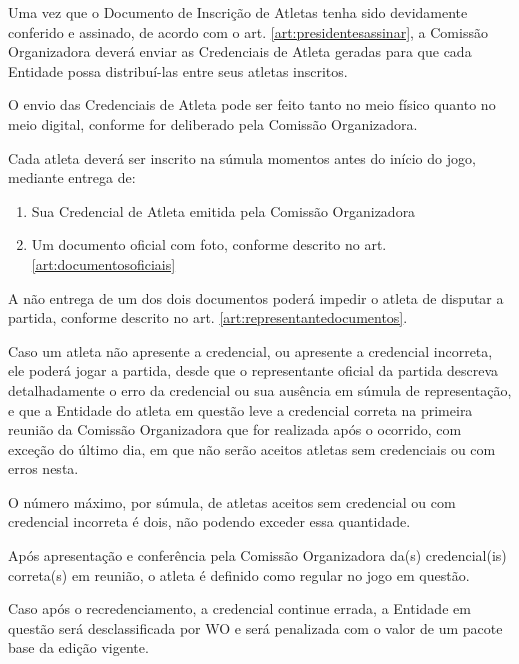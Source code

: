\begin{article}
    Uma vez que o Documento de Inscrição de Atletas tenha sido devidamente conferido e assinado, de acordo com o art. \ref{art:presidentesassinar}\ulo, a Comissão Organizadora deverá enviar as Credenciais de Atleta geradas para que cada Entidade possa distribuí-las entre seus atletas inscritos.

	\begin{xparagraph}
	    O envio das Credenciais de Atleta pode ser feito tanto no meio físico quanto no meio digital, conforme for deliberado pela Comissão Organizadora.
	\end{xparagraph}
\end{article}

\begin{article}
    Cada atleta deverá ser inscrito na súmula momentos antes do início do jogo, mediante entrega de:
	\begin{enumerate}[noitemsep,leftmargin=2\parindent]
		\item Sua Credencial de Atleta emitida pela Comissão Organizadora
		\item Um documento oficial com foto, conforme descrito no art. \ref{art:documentosoficiais}\ulo
	\end{enumerate}

	\begin{xparagraph}
	     A não entrega de um dos dois documentos poderá impedir o atleta de disputar a partida, conforme descrito no art. \ref{art:representantedocumentos}\ulo.
	\end{xparagraph}
\end{article}

\begin{article}
    Caso um atleta não apresente a credencial, ou apresente a credencial incorreta, ele poderá jogar a partida, desde que o representante oficial da partida descreva detalhadamente o erro da credencial ou sua ausência em súmula de representação, e que a Entidade do atleta em questão leve a credencial correta na primeira reunião da Comissão Organizadora que for realizada após o ocorrido, com exceção do último dia, em que não serão aceitos atletas sem credenciais ou com erros nesta.

	\begin{xparagraph}
	    O número máximo, por súmula, de atletas aceitos sem credencial ou com credencial incorreta é dois, não podendo exceder essa quantidade.
	\end{xparagraph}

	\begin{xparagraph}
	    Após apresentação e conferência pela Comissão Organizadora da(s) credencial(is) correta(s) em reunião, o atleta é definido como regular no jogo em questão.
	\end{xparagraph}

	\begin{xparagraph}
	    Caso após o recredenciamento, a credencial continue errada, a Entidade em questão será desclassificada por WO e será penalizada com o valor de um pacote base da edição vigente.
	\end{xparagraph}
\end{article}

